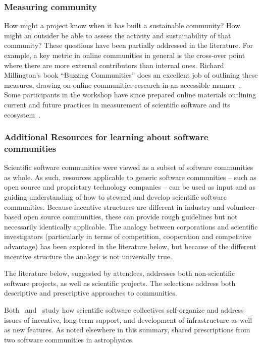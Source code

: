\documentclass[11pt, oneside]{amsart}
\newcommand{\katznote}[1]{ {\textcolor{magenta}    { ***Dan:      #1 }}}
\begin{document}
\subsubsection{Measuring community}
How might a project know when it has built a sustainable community?
How might an outsider be able to assess the activity and
sustainability of that community?  These questions have been partially
addressed in the literature.  For example, a key metric in online
communities in general is the cross-over point where there are more
external contributors than internal ones. Richard Millington's book
``Buzzing Communities'' does an excellent job of outlining these
measures, drawing on online communities research in an accessible
manner~\cite{millington_buzzing_2012}. Some participants in the
workshop have since prepared online materials outlining current and
future practices in measurement of scientific software and its
ecosystem~\cite{metrics-web}.

\subsubsection{Additional Resources for learning about software communities}

Scientific software communities were viewed as a subset of software
communities as whole.  As such, resources applicable to generic
software communities -- such as open source and proprietary technology
companies -- can be used as input and as guiding understanding of how
to steward and develop scientific software communities.  Because
incentive structures are different in industry and volunteer-based
open source communities, these can provide rough guidelines but not
necessarily identically applicable.  The analogy between corporations
and scientific investigators (particularly in terms of competition,
cooperation and competitive advantage) has been explored in the
literature below, but because of the different incentive structure the
analogy is not universally true.

The literature below, suggested by attendees, addresses both
non-scientific software projects, as well as scientific projects.  The
selections address both descriptive and prescriptive approaches to
communities.

Both~\cite{howison_scientific_2011} and~\cite{howison_incentives_2013}
study how scientific software collectives self-organize and address
issues of incentive, long-term support, and development of
infrastructure as well as new features.  As noted elsewhere in this
summary, \cite{Turk:2013:SCH:2484762.2484782} shared prescriptions
from two software communities in astrophysics.
\end{document}
